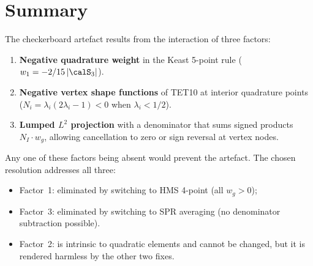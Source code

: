 \section{Summary}

The checkerboard artefact results from the interaction of three factors:

\begin{enumerate}[nosep]
  \item \textbf{Negative quadrature weight} in the Keast 5-point rule
        ($w_1 = -2/15\,|\calS_3|$).
  \item \textbf{Negative vertex shape functions} of TET10 at interior
        quadrature points ($N_i = \lambda_i(2\lambda_i - 1) < 0$ when
        $\lambda_i < 1/2$).
  \item \textbf{Lumped $L^2$ projection} with a denominator that sums signed
        products $N_I \cdot w_g$, allowing cancellation to zero or sign
        reversal at vertex nodes.
\end{enumerate}

Any one of these factors being absent would prevent the artefact.  The chosen
resolution addresses all three:
\begin{itemize}[nosep]
  \item Factor~1: eliminated by switching to HMS 4-point (all $w_g > 0$);
  \item Factor~3: eliminated by switching to SPR averaging (no denominator
        subtraction possible).
  \item Factor~2: is intrinsic to quadratic elements and cannot be changed, but
        it is rendered harmless by the other two fixes.
\end{itemize}
